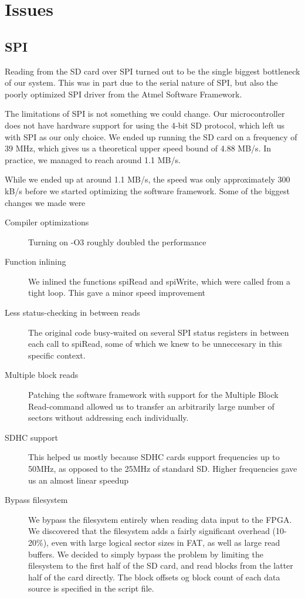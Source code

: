 \section{Issues}

\subsection{\ac{SPI}}
\label{sec:avr-spi-issues}
Reading from the \ac{SD} card over \ac{SPI} turned out to be the single biggest
bottleneck of our system. This was in part due to the serial nature of \ac{SPI},
but also the poorly optimized \ac{SPI} driver from the Atmel Software Framework.

The limitations of \ac{SPI} is not something we could change. Our
microcontroller does not have hardware support for using the 4-bit \ac{SD}
protocol, which left us with \ac{SPI} as our only choice. We ended up running
the \ac{SD} card on a frequency of 39 MHz, which gives us a theoretical upper
speed bound of 4.88 MB/s. In practice, we managed to reach around 1.1 MB/s.

While we ended up at around 1.1 MB/s, the speed was only approximately 300 kB/s
before we started optimizing the software framework. Some of the biggest changes
we made were
\begin{description}
\item[Compiler optimizations] Turning on -O3 roughly doubled
  the performance
\item[Function inlining] We inlined the functions spiRead and
  spiWrite, which were called from a tight loop. This gave a minor speed
  improvement
\item[Less status-checking in between reads] The original code busy-waited on
  several \ac{SPI} status registers in between each call to spiRead, some of
  which we knew to be unneccesary in this specific context.
\item[Multiple block reads] Patching the software framework with support for the
  Multiple Block Read-command allowed us to transfer an arbitrarily large number
  of sectors without addressing each individually.
\item[SDHC support] This helped us mostly because \ac{SDHC} cards support
  frequencies up to 50MHz, as opposed to the 25MHz of standard \ac{SD}. Higher
  frequencies gave us an almost linear speedup
\item[Bypass filesystem] We bypass the filesystem entirely when reading data
  input to the \ac{FPGA}. We discovered that the filesystem adds a fairly
  significant overhead (10-20\%), even with large logical sector sizes in
  \ac{FAT}, as well as large read buffers. We decided to simply bypass the
  problem by limiting the filesystem to the first half of the \ac{SD} card, and
  read blocks from the latter half of the card directly. The block offsets og
  block count of each data source is specified in the script file.
\end{description}

